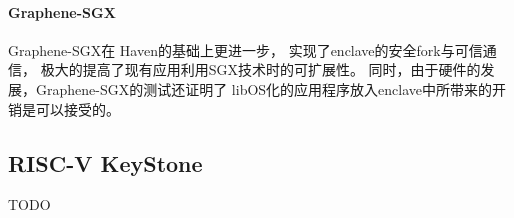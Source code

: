 \paragraph{Graphene-SGX}Graphene-SGX在 Haven的基础上更进一步，
实现了enclave的安全fork与可信通信，
极大的提高了现有应用利用SGX技术时的可扩展性。
同时，由于硬件的发展，Graphene-SGX的测试还证明了
libOS化的应用程序放入enclave中所带来的开销是可以接受的。

\subsection{RISC-V KeyStone}
TODO

